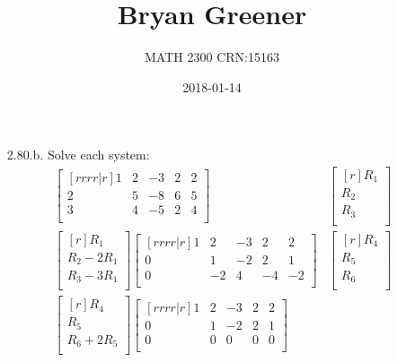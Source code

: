 \documentclass[12pt]{article}
\title{Bryan Greener}
\author{MATH 2300 CRN:15163}
\date{2018-01-14}
\begin{document}
\maketitle

\TabPositions{4cm}
\begin{enumerate}
\item[2.80.b.] Solve each system:\\
	\begin{align*}
	\begin{bmatrix}[rrrr|r]
	1 & 2 & -3 & 2 & 2\\
	2 & 5 & -8 & 6 & 5\\
	3 & 4 & -5 & 2 & 4\\
	\end{bmatrix}&
	\begin{bmatrix}[r]
	R_1\\ R_2\\ R_3\\
	\end{bmatrix}\\
	\begin{bmatrix}[r]
	R_1\\
	R_2 - 2R_1\\
	R_3-3R_1\\
	\end{bmatrix}
	\begin{bmatrix}[rrrr|r]
	1 & 2 & -3 & 2 & 2\\
	0 & 1 & -2 & 2 & 1\\
	0 & -2 & 4 & -4 & -2\\
	\end{bmatrix}&
	\begin{bmatrix}[r]
	R_{4}\\ R_{5}\\ R_{6}\\	
	\end{bmatrix}\\
	\begin{bmatrix}[r]
	R_4\\
	R_5\\
	R_6 + 2R_5\\
	\end{bmatrix}
	\begin{bmatrix}[rrrr|r]
	1 & 2 & -3 & 2 & 2\\
	0 & 1 & -2 & 2 & 1\\
	0 & 0 & 0 & 0 & 0\\
	\end{bmatrix}&

\end{align*}
\end{enumerate}
\end{document}
